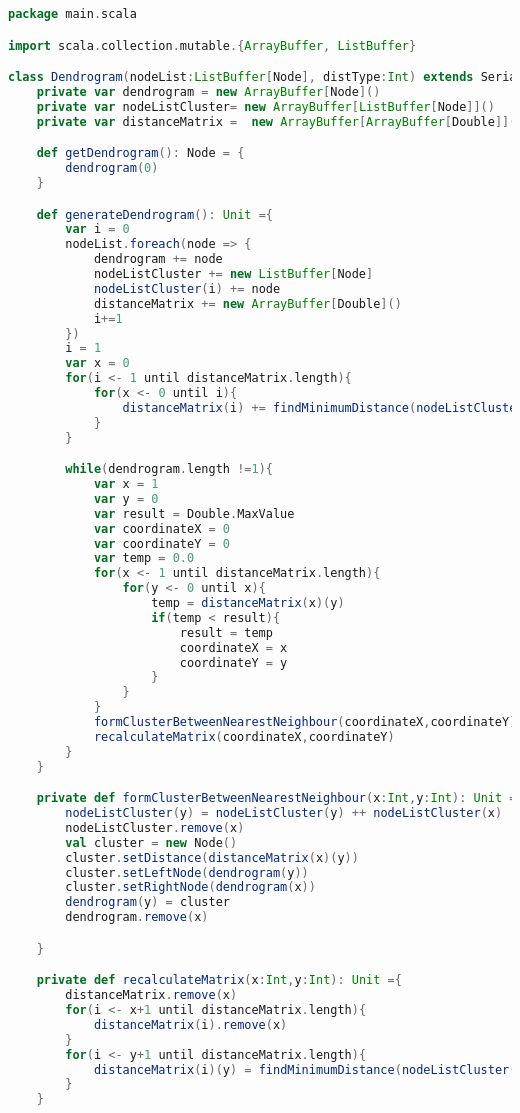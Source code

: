 \begin{lstlisting}[language=Scala, caption=Dendrogram.scala]
package main.scala

import scala.collection.mutable.{ArrayBuffer, ListBuffer}

class Dendrogram(nodeList:ListBuffer[Node], distType:Int) extends Serializable {
    private var dendrogram = new ArrayBuffer[Node]()
    private var nodeListCluster= new ArrayBuffer[ListBuffer[Node]]()
    private var distanceMatrix =  new ArrayBuffer[ArrayBuffer[Double]]()

    def getDendrogram(): Node = {
        dendrogram(0)
    }

    def generateDendrogram(): Unit ={
        var i = 0
        nodeList.foreach(node => {
            dendrogram += node
            nodeListCluster += new ListBuffer[Node]
            nodeListCluster(i) += node
            distanceMatrix += new ArrayBuffer[Double]()
            i+=1
        })
        i = 1
        var x = 0
        for(i <- 1 until distanceMatrix.length){
            for(x <- 0 until i){
                distanceMatrix(i) += findMinimumDistance(nodeListCluster(i),nodeListCluster(x))
            }
        }

        while(dendrogram.length !=1){
            var x = 1
            var y = 0
            var result = Double.MaxValue
            var coordinateX = 0
            var coordinateY = 0
            var temp = 0.0
            for(x <- 1 until distanceMatrix.length){
                for(y <- 0 until x){
                    temp = distanceMatrix(x)(y)
                    if(temp < result){
                        result = temp
                        coordinateX = x
                        coordinateY = y
                    }
                }
            }
            formClusterBetweenNearestNeighbour(coordinateX,coordinateY)
            recalculateMatrix(coordinateX,coordinateY)
        }
    }

    private def formClusterBetweenNearestNeighbour(x:Int,y:Int): Unit = {
        nodeListCluster(y) = nodeListCluster(y) ++ nodeListCluster(x)
        nodeListCluster.remove(x)
        val cluster = new Node()
        cluster.setDistance(distanceMatrix(x)(y))
        cluster.setLeftNode(dendrogram(y))
        cluster.setRightNode(dendrogram(x))
        dendrogram(y) = cluster
        dendrogram.remove(x)

    }

    private def recalculateMatrix(x:Int,y:Int): Unit ={
        distanceMatrix.remove(x)
        for(i <- x+1 until distanceMatrix.length){
            distanceMatrix(i).remove(x)
        }
        for(i <- y+1 until distanceMatrix.length){
            distanceMatrix(i)(y) = findMinimumDistance(nodeListCluster(i), nodeListCluster(y))
        }
    }


\end{lstlisting}
